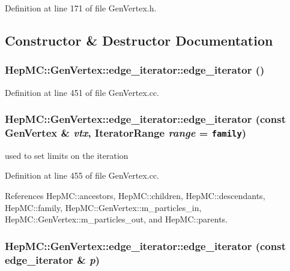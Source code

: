 Definition at line 171 of file Gen\-Vertex.h.

\subsection{Constructor \& Destructor Documentation}
\subsubsection{\setlength{\rightskip}{0pt plus 5cm}Hep\-MC::Gen\-Vertex::edge\_\-iterator::edge\_\-iterator ()}\label{classHepMC_1_1GenVertex_1_1edge__iterator_cf00762381cf18f6edc090cc3c720491}




Definition at line 451 of file Gen\-Vertex.cc.
\subsubsection{\setlength{\rightskip}{0pt plus 5cm}Hep\-MC::Gen\-Vertex::edge\_\-iterator::edge\_\-iterator (const {\bf Gen\-Vertex} \& {\em vtx}, {\bf Iterator\-Range} {\em range} = {\tt family})}\label{classHepMC_1_1GenVertex_1_1edge__iterator_1809c321aeb1a906c9f9757109d4f731}


used to set limits on the iteration 



Definition at line 455 of file Gen\-Vertex.cc.

References Hep\-MC::ancestors, Hep\-MC::children, Hep\-MC::descendants, Hep\-MC::family, Hep\-MC::Gen\-Vertex::m\_\-particles\_\-in, Hep\-MC::Gen\-Vertex::m\_\-particles\_\-out, and Hep\-MC::parents.
\subsubsection{\setlength{\rightskip}{0pt plus 5cm}Hep\-MC::Gen\-Vertex::edge\_\-iterator::edge\_\-iterator (const {\bf edge\_\-iterator} \& {\em p})}\label{classHepMC_1_1GenVertex_1_1edge__iterator_8cf25fc644886531908c70e868cada4f}


